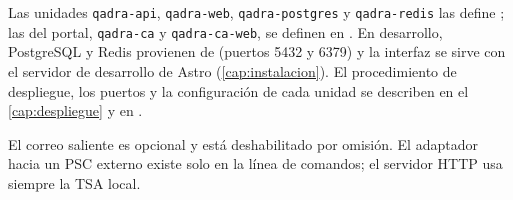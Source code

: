 Las unidades \texttt{qadra-api}, \texttt{qadra-web}, \texttt{qadra-postgres}
y \texttt{qadra-redis} las define ; las del
portal, \texttt{qadra-ca} y \texttt{qadra-ca-web}, se definen en
. En desarrollo, PostgreSQL y Redis provienen de
 (puertos 5432 y 6379) y la interfaz se sirve con el
servidor de desarrollo de Astro (\cref{cap:instalacion}). El procedimiento de
despliegue, los puertos y la configuración de cada unidad se describen en el
\cref{cap:despliegue} y en .

El correo saliente es opcional y está deshabilitado por omisión. El adaptador
hacia un PSC externo existe solo en la línea de comandos; el servidor HTTP
usa siempre la TSA local.
